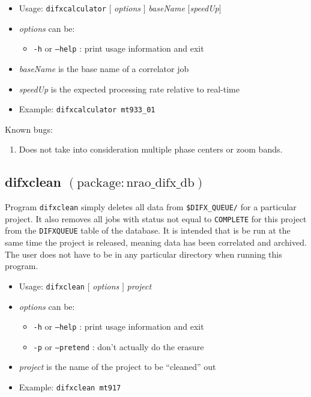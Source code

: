 \begin{itemize}
\item[] Usage: {\tt difxcalculator} $[$ {\em options} $]$ {\em baseName} $[${\em speedUp}$]$
\item[] {\em options} can be:
\begin{itemize}
\item[] {\tt -h} or {\tt --help} : print usage information and exit
\end{itemize}
\item[] {\em baseName} is the base name of a correlator job
\item[] {\em speedUp} is the expected processing rate relative to real-time
\item[] Example: {\tt difxcalculator mt933\_01}
\end{itemize}

\noindent
Known bugs:
\begin{enumerate}
\item Does not take into consideration multiple phase centers or zoom bands.
\end{enumerate}







\subsection{difxclean {\small $\mathrm{(package: nrao\_difx\_db)}$}} \label{sec:difxclean}

Program {\tt difxclean} simply deletes all data from {\tt \$DIFX\_QUEUE/} for a particular project.
It also removes all jobs with status not equal to {\tt COMPLETE} for this project from the {\tt DIFXQUEUE} table of the database.
It is intended that is be run at the same time the project is released, meaning data has been correlated and archived.
The user does not have to be in any particular directory when running this program.

\begin{itemize}
\item[] Usage: {\tt difxclean} $[$ {\em options} $]$ {\em project}
\item[] {\em options} can be:
\begin{itemize}
\item[] {\tt -h} or {\tt --help} : print usage information and exit
\item[] {\tt -p} or {\tt --pretend} : don't actually do the erasure
\end{itemize}
\item[] {\em project} is the name of the project to be ``cleaned'' out
\item[] Example: {\tt difxclean mt917}
\end{itemize}








